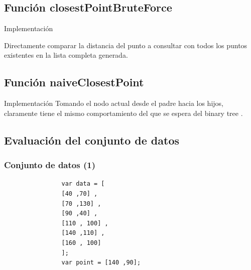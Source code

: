 \documentclass[11pt]{beamer}
\begin{document}
	\subsection{Función closestPointBruteForce}
		\begin{frame}{Implementación}
		\justifying
		
		 Directamente comparar la distancia del punto a consultar con  todos  los  puntos  existentes  en  la  lista  completa  generada. 
		
		
		
	    \end{frame}
		
	\subsection{ Función naiveClosestPoint}
		\begin{frame}{Implementación}
			\justifying
			 Tomando el nodo actual desde el padre hacia los hijos, claramente tiene el mismo comportamiento del que se espera del binary tree \cite{compgeom:2000}.
			 
			
			
		\end{frame}
	
	\subsection{Evaluación del conjunto de datos}
		\begin{frame}[fragile]\frametitle{Conjunto de datos (1)}
			\justifying
			\begin{verbatim}
			    var data = [
                [40 ,70] ,
                [70 ,130] ,
                [90 ,40] ,
                [110 , 100] ,
                [140 ,110] ,
                [160 , 100]
                ];
                var point = [140 ,90]; 
            \end{verbatim}
			
		\end{frame}
		
\end{document}
